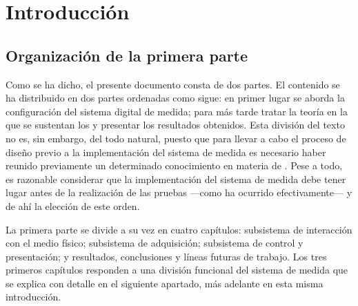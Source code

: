 \chapter*{Introducción}

\section*{Organización de la primera parte}

Como se ha dicho, el presente documento consta de dos partes. El contenido
se ha distribuido en dos partes ordenadas como sigue: en primer lugar se
aborda la configuración del sistema digital de medida; para más tarde
tratar la teoría en la que se sustentan los  y presentar los
resultados obtenidos. Esta división del texto no es, sin embargo, del todo
natural, puesto que para llevar a cabo el proceso de diseño previo a la
implementación del sistema de medida es necesario haber reunido previamente
un determinado conocimiento en materia de . Pese a todo, es
razonable considerar que la implementación del sistema de medida debe tener
lugar antes de la realización de las pruebas ---como ha ocurrido
efectivamente--- y de ahí la elección de este orden.

La primera parte se divide a su vez en cuatro capítulos: subsistema de
interacción con el medio físico; subsistema de adquisición; subsistema de
control y presentación; y resultados, conclusiones y líneas futuras de
trabajo. Los tres primeros capítulos responden a una división funcional del
sistema de medida que se explica con detalle en el siguiente apartado, más
adelante en esta misma introducción.


